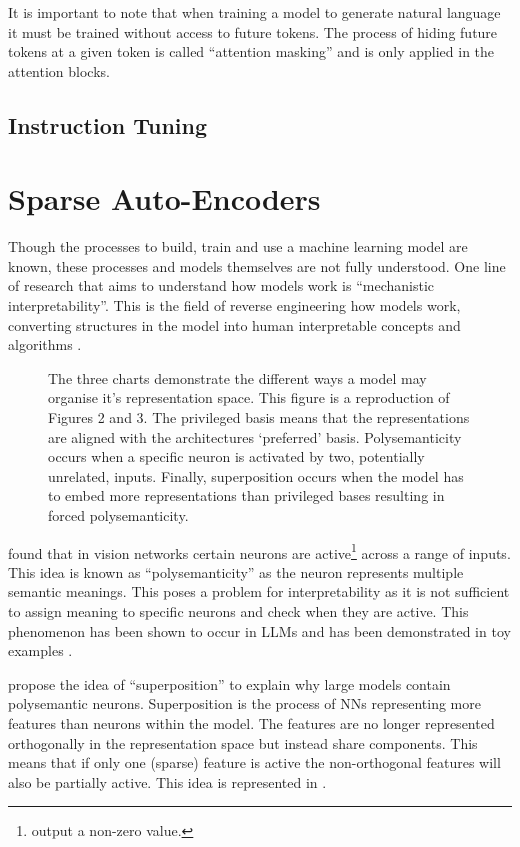It is important to note that when training a model to generate natural language it must be trained without access to future tokens.
The process of hiding future tokens at a given token is called ``attention masking'' and is only applied in the attention blocks.

\subsection{Instruction Tuning}

\section{Sparse Auto-Encoders}
\label{sec:sae}

Though the processes to build, train and use a machine learning model are known, these processes and models themselves are not fully understood.
One line of research that aims to understand how models work is ``mechanistic interpretability''.
This is the field of reverse engineering how models work, converting structures in the model into human interpretable concepts and algorithms \citep{mech-interp}.

\begin{figure}
    \centering
    \captionsetup{width=.9\textwidth}
    
    \caption{The three charts demonstrate the different ways a model may organise it's representation space. This figure is a reproduction of \citet{superposition} Figures 2 and 3. The privileged basis means that the representations are aligned with the architectures `preferred' basis. Polysemanticity occurs when a specific neuron is activated by two, potentially unrelated, inputs. Finally, superposition occurs when the model has to embed more representations than privileged bases resulting in forced polysemanticity.}
    \label{fig:superposition}
\end{figure}

\citet{polysemanticity} found that in vision networks certain neurons are active\footnote{output a non-zero value.} across a range of inputs.
This idea is known as ``polysemanticity'' as the neuron represents multiple semantic meanings.
This poses a problem for interpretability as it is not sufficient to assign meaning to specific neurons and check when they are active.
This phenomenon has been shown to occur in LLMs and has been demonstrated in toy examples \citep{superposition}.

\citet{superposition} propose the idea of ``superposition'' to explain why large models contain polysemantic neurons.
Superposition is the process of NNs representing more features than neurons within the model.
The features are no longer represented orthogonally in the representation space but instead share components.
This means that if only one (sparse) feature is active the non-orthogonal features will also be partially active.
This idea is represented in .

